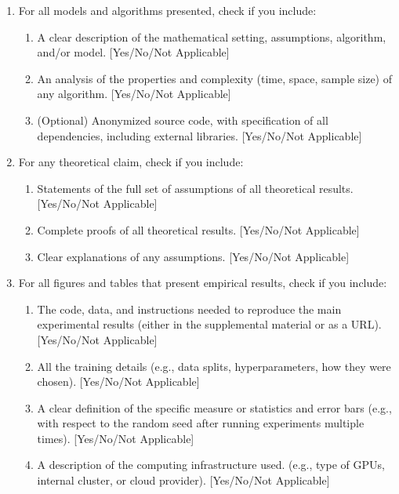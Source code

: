 \documentclass[twoside]{article}
\begin{document}
\begin{enumerate}

  \item For all models and algorithms presented, check if you include:
  \begin{enumerate}
    \item A clear description of the mathematical setting, assumptions, algorithm, and/or model. [Yes/No/Not Applicable]
    \item An analysis of the properties and complexity (time, space, sample size) of any algorithm. [Yes/No/Not Applicable]
    \item (Optional) Anonymized source code, with specification of all dependencies, including external libraries. [Yes/No/Not Applicable]
  \end{enumerate}

  \item For any theoretical claim, check if you include:
  \begin{enumerate}
    \item Statements of the full set of assumptions of all theoretical results. [Yes/No/Not Applicable]
    \item Complete proofs of all theoretical results. [Yes/No/Not Applicable]
    \item Clear explanations of any assumptions. [Yes/No/Not Applicable]     
  \end{enumerate}

  \item For all figures and tables that present empirical results, check if you include:
  \begin{enumerate}
    \item The code, data, and instructions needed to reproduce the main experimental results (either in the supplemental material or as a URL). [Yes/No/Not Applicable]
    \item All the training details (e.g., data splits, hyperparameters, how they were chosen). [Yes/No/Not Applicable]
    \item A clear definition of the specific measure or statistics and error bars (e.g., with respect to the random seed after running experiments multiple times). [Yes/No/Not Applicable]
    \item A description of the computing infrastructure used. (e.g., type of GPUs, internal cluster, or cloud provider). [Yes/No/Not Applicable]
  \end{enumerate}


\end{enumerate}
\end{document}
